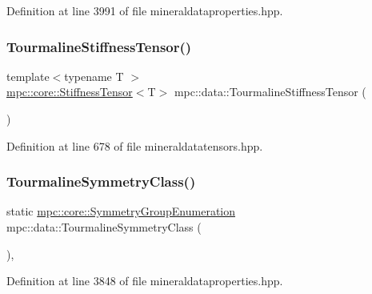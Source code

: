 Definition at line 3991 of file mineraldataproperties.\+hpp.

\mbox{\label{namespacempc_1_1data_aea9a29c1e41fb60d7e2373216a54b90e}} 
\subsubsection{\texorpdfstring{Tourmaline\+Stiffness\+Tensor()}{TourmalineStiffnessTensor()}}
{\footnotesize\ttfamily template$<$typename T $>$ \\
\mbox{\hyperlink{structmpc_1_1core_1_1_stiffness_tensor}{mpc\+::core\+::\+Stiffness\+Tensor}}$<$T$>$ mpc\+::data\+::\+Tourmaline\+Stiffness\+Tensor (\begin{DoxyParamCaption}{ }\end{DoxyParamCaption})}



Definition at line 678 of file mineraldatatensors.\+hpp.

\mbox{\label{namespacempc_1_1data_a1e0ce1adbf37fb11e488b6c5c50ac5e8}} 
\subsubsection{\texorpdfstring{Tourmaline\+Symmetry\+Class()}{TourmalineSymmetryClass()}}
{\footnotesize\ttfamily static \mbox{\hyperlink{namespacempc_1_1core_a9d979684062547055a0ef5c13077bad8}{mpc\+::core\+::\+Symmetry\+Group\+Enumeration}} mpc\+::data\+::\+Tourmaline\+Symmetry\+Class (\begin{DoxyParamCaption}{ }\end{DoxyParamCaption})\hspace{0.3cm}{\ttfamily [inline]}, {\ttfamily [static]}}



Definition at line 3848 of file mineraldataproperties.\+hpp.

\mbox{\label{namespacempc_1_1data_a1d8071d158a75ed5ded083a08ff99f54}} 
